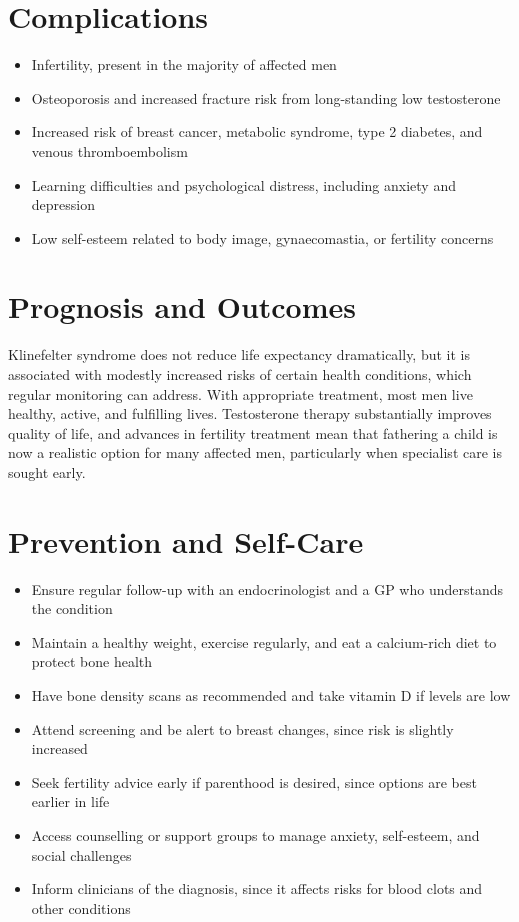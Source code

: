\section*{Complications}
\begin{itemize}
    \item Infertility, present in the majority of affected men
    \item Osteoporosis and increased fracture risk from long-standing low testosterone
    \item Increased risk of breast cancer, metabolic syndrome, type 2 diabetes, and venous thromboembolism
    \item Learning difficulties and psychological distress, including anxiety and depression
    \item Low self-esteem related to body image, gynaecomastia, or fertility concerns
\end{itemize}

\section*{Prognosis and Outcomes}
Klinefelter syndrome does not reduce life expectancy dramatically, but it is associated with modestly increased risks of certain health conditions, which regular monitoring can address. With appropriate treatment, most men live healthy, active, and fulfilling lives. Testosterone therapy substantially improves quality of life, and advances in fertility treatment mean that fathering a child is now a realistic option for many affected men, particularly when specialist care is sought early.

\section*{Prevention and Self-Care}
\begin{itemize}
    \item Ensure regular follow-up with an endocrinologist and a GP who understands the condition
    \item Maintain a healthy weight, exercise regularly, and eat a calcium-rich diet to protect bone health
    \item Have bone density scans as recommended and take vitamin D if levels are low
    \item Attend screening and be alert to breast changes, since risk is slightly increased
    \item Seek fertility advice early if parenthood is desired, since options are best earlier in life
    \item Access counselling or support groups to manage anxiety, self-esteem, and social challenges
    \item Inform clinicians of the diagnosis, since it affects risks for blood clots and other conditions
\end{itemize}

